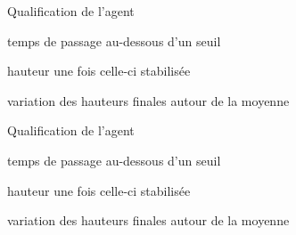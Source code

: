 \documentclass[tikz, footheight=2em]{beamer}
\begin{document}
\begin{frame}[c]{Qualification de l'agent}
  \begin{description}
    \item[Décroissance] temps de passage au-dessous d'un seuil
    \item[Hauteur finale] hauteur une fois celle-ci stabilisée
    \item[Stabilité] variation des hauteurs finales autour de la moyenne
  \end{description}
  \begin{figure}[H]
  \end{figure}
\end{frame}

\begin{frame}[c]{Qualification de l'agent}
  \begin{description}
    \item[Décroissance] temps de passage au-dessous d'un seuil
    \item[Hauteur finale] hauteur une fois celle-ci stabilisée
    \item[Stabilité] variation des hauteurs finales autour de la moyenne
  \end{description}
  \begin{figure}[H]
  \end{figure}
\end{frame}
\end{document}
